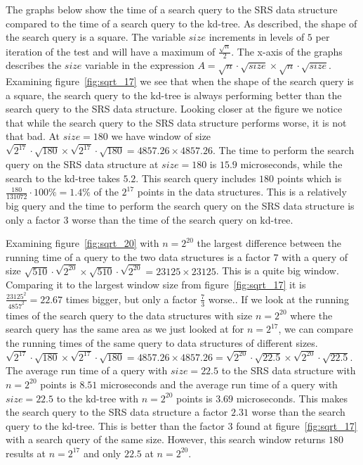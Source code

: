 The graphs below show the time of a search query to the SRS data structure compared to the time of a search query to the kd-tree. As described, the shape of the search query is a square. The variable $size$ increments in levels of $5$ per iteration of the test and will have a maximum of $\frac{\sqrt{n}}{2}$. The x-axis of the graphs describes the $size$ variable in the expression $A = \sqrt{n}\cdot\sqrt{size} \times \sqrt{n}\cdot\sqrt{size}$. Examining figure~\ref{fig:sqrt_17} we see that when the shape of the search query is a square, the search query to the kd-tree is always performing better than the search query to the SRS data structure. Looking closer at the figure we notice that while the search query to the SRS data structure performs worse, it is not that bad. At $size = 180$ we have window of size $\sqrt{2^{17}}\cdot\sqrt{180} \times \sqrt{2^{17}}\cdot\sqrt{180} = 4857.26 \times 4857.26$. The time to perform the search query on the SRS data structure at $size = 180$ is $15.9$ microseconds, while the search to the kd-tree takes $5.2$. This search query includes $180$ points which is $\frac{180}{131072}\cdot 100\% = 1.4\%$ of the $2^{17}$ points in the data structures. This is a relatively big query and the time to perform the search query on the SRS data structure is only a factor $3$ worse than the time of the search query on kd-tree.

Examining figure~\ref{fig:sqrt_20} with $n = 2^{20}$ the largest difference between the running time of a query to the two data structures is a factor $7$ with a query of size $\sqrt{510}\cdot\sqrt{2^{20}} \times \sqrt{510}\cdot\sqrt{2^{20}} = 23125 \times 23125$. This is a quite big window. Comparing it to the largest window size from figure~\ref{fig:sqrt_17} it is $\frac{23125^2}{4857^2} = 22.67$ times bigger, but only a factor $\frac{7}{3}$ worse.. If we look at the running times of the search query to the data structures with size $n = 2^{20}$ where the search query has the same area as we just looked at for $n = 2^{17}$, we can compare the running times of the same query to data structures of different sizes. $\sqrt{2^{17}}\cdot\sqrt{180} \times \sqrt{2^{17}}\cdot\sqrt{180} = 4857.26 \times 4857.26 = \sqrt{2^{20}}\cdot\sqrt{22.5} \times \sqrt{2^{20}}\cdot\sqrt{22.5}$. The average run time of a query with $size = 22.5$ to the SRS data structure with $n = 2^{20}$ points is $8.51$ microseconds and the average run time of a query with $size = 22.5$ to the kd-tree with $n = 2^{20}$ points is $3.69$ microseconds. This makes the search query to the SRS data structure a factor $2.31$ worse than the search query to the kd-tree. This is better than the factor $3$ found at figure~\ref{fig:sqrt_17} with a search query of the same size. However, this search window returns $180$ results at $n = 2^{17}$ and only $22.5$ at $n = 2^{20}$.

